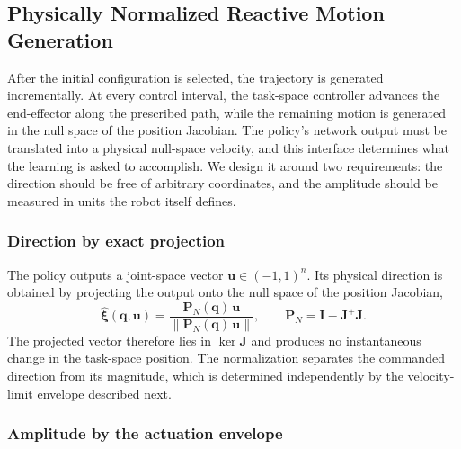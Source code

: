 \documentclass[journal, twoside]{IEEEtran}
\begin{document}
\subsection{Physically Normalized Reactive Motion Generation}
\label{sec:traj}

After the initial configuration is selected, the trajectory is generated
incrementally. At every control interval, the task-space controller
advances the end-effector along the prescribed path, while the remaining
motion is generated in the null space of the position Jacobian. The
policy's network output must be translated into a physical null-space
velocity, and this interface determines what the learning is asked to
accomplish. We design it around two requirements: the direction should be
free of arbitrary coordinates, and the amplitude should be measured in
units the robot itself defines.

\subsubsection{Direction by exact projection}

The policy outputs a joint-space vector
$\mathbf{u}\in(-1,1)^{n}$. Its physical direction is obtained by projecting
the output onto the null space of the position Jacobian,
\begin{equation}
\label{eq:dirproj}
\hat{\boldsymbol{\xi}}(\mathbf{q},\mathbf{u})
=
\frac{\mathbf{P}_{N}(\mathbf{q})\,\mathbf{u}}
     {\left\|\mathbf{P}_{N}(\mathbf{q})\,\mathbf{u}\right\|},
\qquad
\mathbf{P}_{N}
=
\mathbf{I}-\mathbf{J}^{+}\mathbf{J}.
\end{equation}
The projected vector therefore lies in
$\ker\mathbf{J}$ and produces no instantaneous change in the task-space
position. The normalization separates the commanded direction from its
magnitude, which is determined independently by the velocity-limit
envelope described next.

\subsubsection{Amplitude by the actuation envelope}
\end{document}
